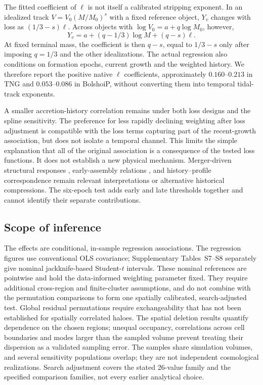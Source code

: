 \documentclass[11pt,a4paper]{article}
\begin{document}
The fitted coefficient of $\ell$ is not itself a calibrated stripping exponent. In an idealized track $V=V_0(M/M_0)^s$ with a fixed reference object, $Y_v$ changes with loss as $(1/3-s)\ell$. Across objects with $\log V_0=a+q\log M_0$, however,
\begin{equation}
Y_v=a+(q-1/3)\log M+(q-s)\ell.
\end{equation}
At fixed terminal mass, the coefficient is then $q-s$, equal to $1/3-s$ only after imposing $q=1/3$ and the other idealizations. The actual regression also conditions on formation epochs, current growth and the weighted history. We therefore report the positive native $\ell$ coefficients, approximately $0.160$--$0.213$ in TNG and $0.053$--$0.086$ in BolshoiP, without converting them into temporal tidal-track exponents.

A smaller accretion-history correlation remains under both loss designs and the spline sensitivity. The preference for less rapidly declining weighting after loss adjustment is compatible with the loss terms capturing part of the recent-growth association, but does not isolate a temporal channel. This limits the simple explanation that all of the original association is a consequence of the tested loss functions. It does not establish a new physical mechanism. Merger-driven structural responses \citep{Wang2020}, early-assembly relations \citep{Zhao2009}, and history--profile correspondence \citep{Ludlow2013,Ludlow2016} remain relevant interpretations or alternative historical compressions. The six-epoch test adds early and late thresholds together and cannot identify their separate contributions.

\subsection{Scope of inference}\label{sec:limitations}
The effects are conditional, in-sample regression associations. The regression figures use conventional OLS covariance; Supplementary Tables~S7--S8 separately give nominal jackknife-based Student-$t$ intervals. These nominal references are pointwise and hold the data-informed weighting parameter fixed. They require additional cross-region and finite-cluster assumptions, and do not combine with the permutation comparisons to form one spatially calibrated, search-adjusted test. Global residual permutations require exchangeability that has not been established for spatially correlated haloes. The spatial deletion results quantify dependence on the chosen regions; unequal occupancy, correlations across cell boundaries and modes larger than the sampled volume prevent treating their dispersion as a validated sampling error. The samples share simulation volumes, and several sensitivity populations overlap; they are not independent cosmological realizations. Search adjustment covers the stated 26-value family and the specified comparison families, not every earlier analytical choice.
\end{document}
